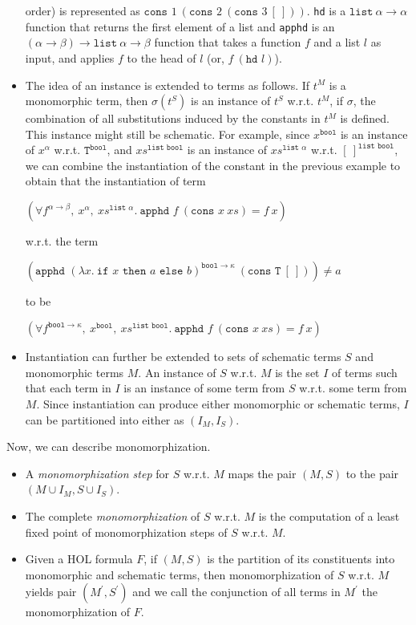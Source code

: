 \documentclass{article}
\begin{document}
\begin{itemize}
		order) is represented as 
		$\texttt{cons }1\ (\texttt{cons }2
		\ (\texttt{cons }3\ [\ ]))$.
		\texttt{hd} is a $\texttt{list}\ 
		\alpha \to \alpha$ function that 
		returns the first element of a list 
		and \texttt{apphd} is an $(\alpha
		\to \beta) \to \texttt{list}\
		\alpha \to \beta$ function that
		takes a function $f$ and a list 
		$l$ as input, and applies $f$
		to the head of $l$ (or, $f\ 
		(\texttt{hd }l)$).
		\item The idea of an instance is 
		extended to terms as follows. If 
		$t^M$ is a monomorphic term, then 
		$\sigma(t^S)$ is an instance of 
		$t^S$ w.r.t. $t^M$, if 
		$\sigma$, the combination of all 
		substitutions induced by the 
		constants in $t^M$ is defined. This 
		instance might still be schematic. For 
		example, since $x^{\texttt{bool}}$ is 
		an instance of $x^{\alpha}$ w.r.t.
		$\texttt{T}^{\texttt{bool}}$, 
		and $xs^{\texttt{list bool}}$ is 
		an instance of 
		$xs^{\texttt{list }\alpha}$ 
		w.r.t. $[\ ]^{\texttt{list bool}}$,
		we can combine the instantiation 
		of the constant in the previous 
		example to obtain that the 
		instantiation of term
		\begin{center}
			$(\forall f^{\alpha \to \beta},\ 
			x^{\alpha},\ xs^{\texttt{list }
				\alpha}.\ \texttt{apphd }f\ 
			(\texttt{cons }x\ xs) = f\ x)$
		\end{center}
		w.r.t. the term
		\begin{center}
			$(\texttt{apphd }(\lambda 
			x.\ \texttt{if }x\texttt{ then }
			a \texttt{ else } b)^{\texttt{bool} 
				\to \kappa}\ (\texttt{cons T}\ 
			[\ ])) \neq a$
		\end{center}
		to be
		\begin{center}
			$(\forall f^{\texttt{bool}
				\to \kappa},\ x^{\texttt{bool}},
			\ xs^{\texttt{list bool}}.\ 
			\texttt{apphd }f\ (\texttt{cons }x
			\ xs) = f\ x)$
		\end{center}
		\item Instantiation can further be 
		extended to sets of schematic 
		terms $S$ and monomorphic terms $M$. 
		An instance of $S$ w.r.t. 
		$M$ is the set $I$ of terms such 
		that each term in $I$ is an instance 
		of some term from $S$ w.r.t. 
		some term from $M$. Since 
		instantiation can produce either 
		monomorphic or schematic terms, $I$
		can be partitioned into either as
		$(I_M, I_S)$.
	\end{itemize}
	Now, we can describe monomorphization.
	\begin{itemize}
		\item A \textit{monomorphization 
			step} for $S$ w.r.t. $M$ maps 
		the pair $(M,S)$ to the pair 
		$(M \cup I_M, S \cup I_S)$.
		\item The complete 
		\textit{monomorphization} of $S$ 
		w.r.t. $M$ is the computation of 
		a least fixed point of 
		monomorphization steps of $S$ 
		w.r.t. $M$.
		\item Given a HOL formula $F$, 
		if $(M, S)$ is the partition of its 
		constituents into monomorphic and 
		schematic terms, then 
		monomorphization of $S$ 
		w.r.t. $M$ yields pair 
		$(M^{\prime}, S^{\prime})$ and we 
		call the conjunction of all terms in 
		$M^{\prime}$ the monomorphization 
		of $F$.
	\end{itemize}
\end{document}
